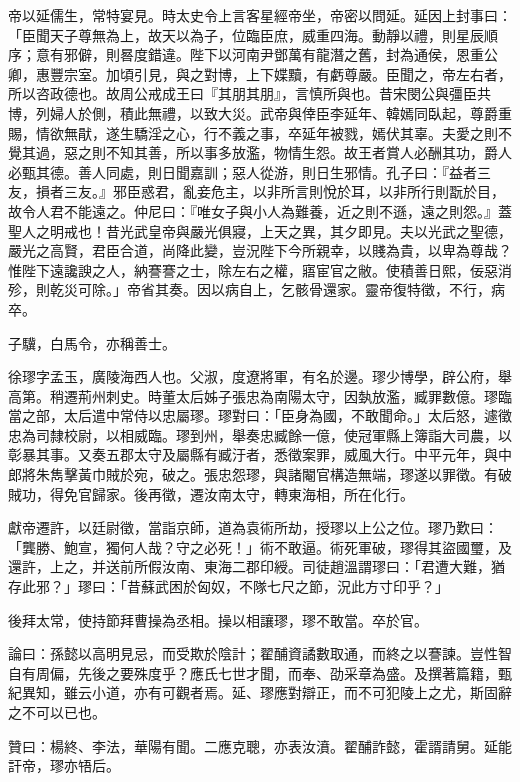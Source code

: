 \begin{pinyinscope}
帝以延儒生，常特宴見。時太史令上言客星經帝坐，帝密以問延。延因上封事曰：「臣聞天子尊無為上，故天以為子，位臨臣庶，威重四海。動靜以禮，則星辰順序；意有邪僻，則晷度錯違。陛下以河南尹鄧萬有龍潛之舊，封為通侯，恩重公卿，惠豐宗室。加頃引見，與之對博，上下媟黷，有虧尊嚴。臣聞之，帝左右者，所以咨政德也。故周公戒成王曰『其朋其朋』，言慎所與也。昔宋閔公與彊臣共博，列婦人於側，積此無禮，以致大災。武帝與倖臣李延年、韓嫣同臥起，尊爵重賜，情欲無猒，遂生驕淫之心，行不義之事，卒延年被戮，嫣伏其辜。夫愛之則不覺其過，惡之則不知其善，所以事多放濫，物情生怨。故王者賞人必酬其功，爵人必甄其德。善人同處，則日聞嘉訓；惡人從游，則日生邪情。孔子曰：『益者三友，損者三友。』邪臣惑君，亂妾危主，以非所言則悅於耳，以非所行則翫於目，故令人君不能遠之。仲尼曰：『唯女子與小人為難養，近之則不遜，遠之則怨。』蓋聖人之明戒也！昔光武皇帝與嚴光俱寢，上天之異，其夕即見。夫以光武之聖德，嚴光之高賢，君臣合道，尚降此變，豈況陛下今所親幸，以賤為貴，以卑為尊哉？惟陛下遠讒諛之人，納謇謇之士，除左右之權，寤宦官之敝。使積善日熙，佞惡消殄，則乾災可除。」帝省其奏。因以病自上，乞骸骨還家。靈帝復特徵，不行，病卒。

子驥，白馬令，亦稱善士。

徐璆字孟玉，廣陵海西人也。父淑，度遼將軍，有名於邊。璆少博學，辟公府，舉高第。稍遷荊州刺史。時董太后姊子張忠為南陽太守，因埶放濫，臧罪數億。璆臨當之部，太后遣中常侍以忠屬璆。璆對曰：「臣身為國，不敢聞命。」太后怒，遽徵忠為司隸校尉，以相威臨。璆到州，舉奏忠臧餘一億，使冠軍縣上簿詣大司農，以彰暴其事。又奏五郡太守及屬縣有臧汙者，悉徵案罪，威風大行。中平元年，與中郎將朱雋擊黃巾賊於宛，破之。張忠怨璆，與諸閹官構造無端，璆遂以罪徵。有破賊功，得免官歸家。後再徵，遷汝南太守，轉東海相，所在化行。

獻帝遷許，以廷尉徵，當詣京師，道為袁術所劫，授璆以上公之位。璆乃歎曰：「龔勝、鮑宣，獨何人哉？守之必死！」術不敢逼。術死軍破，璆得其盜國璽，及還許，上之，并送前所假汝南、東海二郡印綬。司徒趙溫謂璆曰：「君遭大難，猶存此邪？」璆曰：「昔蘇武困於匈奴，不隊七尺之節，況此方寸印乎？」

後拜太常，使持節拜曹操為丞相。操以相讓璆，璆不敢當。卒於官。

論曰：孫懿以高明見忌，而受欺於陰計；翟酺資譎數取通，而終之以謇諫。豈性智自有周偏，先後之要殊度乎？應氏七世才聞，而奉、劭采章為盛。及撰著篇籍，甄紀異知，雖云小道，亦有可觀者焉。延、璆應對辯正，而不可犯陵上之尤，斯固辭之不可以已也。

贊曰：楊終、李法，華陽有聞。二應克聰，亦表汝濆。翟酺詐懿，霍諝請舅。延能訐帝，璆亦啎后。


\end{pinyinscope}